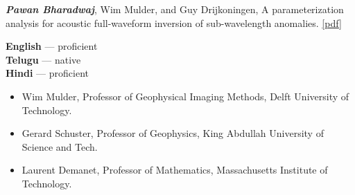 \documentclass[9pt]{developercv} %
\begin{document}
\textbf{\emph{Pawan
Bharadwaj}},
Wim
Mulder,
and Guy
Drijkoningen,
A
parameterization
analysis
for
acoustic
full-waveform
inversion
of
sub-wavelength
anomalies.
\href{https://github.com/pawbz/pawbz.github.io/blob/src/pdf/papers/Param_arXiv.pdf}{{[}pdf{]}}

\begin{minipage}[t]{0.2\textwidth}
	

	\vspace{\baselineskip} %
	
	\textbf{English} --- proficient\\
	\textbf{Telugu} --- native\\
	\textbf{Hindi} --- proficient
\end{minipage}
\hfill
\begin{minipage}[t]{0.8\textwidth}
	
	
	\begin{itemize}
			\setlength\itemsep{0.5pt}
		\item Wim Mulder,  Professor of Geophysical Imaging Methods, Delft University of Technology.
		\item Gerard Schuster,  Professor of Geophysics, King Abdullah University of Science and Tech.
		\item Laurent Demanet, Professor of Mathematics, Massachusetts Institute of Technology.
 
	\end{itemize}
\end{minipage}

\end{document}
